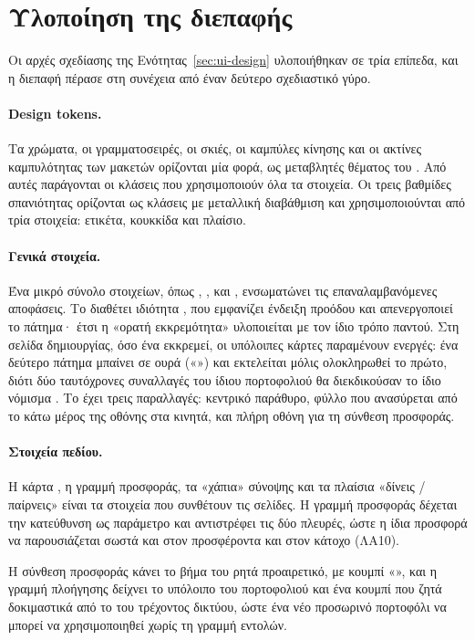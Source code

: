 \section{Υλοποίηση της διεπαφής}
\label{sec:ui-impl}

Οι αρχές σχεδίασης της Ενότητας~\ref{sec:ui-design} υλοποιήθηκαν σε τρία επίπεδα, και η
διεπαφή πέρασε στη συνέχεια από έναν δεύτερο σχεδιαστικό γύρο.

\paragraph{Design tokens.} Τα χρώματα, οι γραμματοσειρές, οι σκιές, οι καμπύλες κίνησης
και οι ακτίνες καμπυλότητας των μακετών ορίζονται μία φορά, ως μεταβλητές θέματος του
. Από αυτές παράγονται οι κλάσεις που χρησιμοποιούν όλα τα στοιχεία. Οι τρεις βαθμίδες
σπανιότητας ορίζονται ως κλάσεις με μεταλλική διαβάθμιση και χρησιμοποιούνται από τρία
στοιχεία: ετικέτα, κουκκίδα και πλαίσιο.

\paragraph{Γενικά στοιχεία.} Ένα μικρό σύνολο στοιχείων, όπως ,
,  και , ενσωματώνει τις επαναλαμβανόμενες αποφάσεις.
Το  διαθέτει ιδιότητα , που εμφανίζει ένδειξη προόδου και
απενεργοποιεί το πάτημα· έτσι η «ορατή εκκρεμότητα» υλοποιείται με τον ίδιο τρόπο παντού.
Στη σελίδα δημιουργίας, όσο ένα  εκκρεμεί, οι υπόλοιπες κάρτες παραμένουν
ενεργές: ένα δεύτερο πάτημα μπαίνει σε ουρά («») και εκτελείται μόλις
ολοκληρωθεί το πρώτο, διότι δύο ταυτόχρονες συναλλαγές του ίδιου πορτοφολιού θα
διεκδικούσαν το ίδιο νόμισμα .
Το  έχει τρεις παραλλαγές: κεντρικό παράθυρο, φύλλο που ανασύρεται από το
κάτω μέρος της οθόνης στα κινητά, και πλήρη οθόνη για τη σύνθεση προσφοράς.

\paragraph{Στοιχεία πεδίου.} Η κάρτα , η γραμμή προσφοράς, τα «χάπια» σύνοψης
και τα πλαίσια «δίνεις / παίρνεις» είναι τα στοιχεία που συνθέτουν τις σελίδες. Η γραμμή
προσφοράς δέχεται την κατεύθυνση ως παράμετρο και αντιστρέφει τις δύο πλευρές, ώστε η ίδια
προσφορά να παρουσιάζεται σωστά και στον προσφέροντα και στον κάτοχο (ΛΑ10).

Η σύνθεση προσφοράς κάνει το βήμα του  ρητά προαιρετικό, με κουμπί
«», και η γραμμή πλοήγησης δείχνει το υπόλοιπο του πορτοφολιού και ένα κουμπί
 που ζητά δοκιμαστικά  από το  του τρέχοντος δικτύου, ώστε
ένα νέο προσωρινό πορτοφόλι να μπορεί να χρησιμοποιηθεί χωρίς τη γραμμή εντολών.

